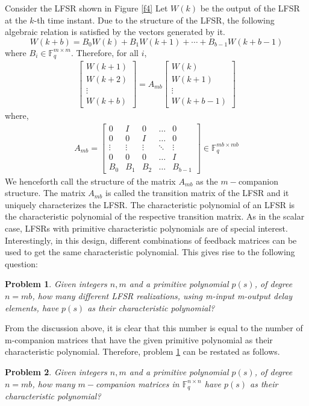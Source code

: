 \documentclass[letterpaper, 12 pt]{article}  \usepackage{amssymb}
\newtheorem{problem}{Problem}
\newcommand{\F}{\mathbb{F}}
\begin{document}
Consider the LFSR shown in Figure \ref{f4} 
Let $W(k)$ be the output
of the LFSR at the
$k$-th time instant. Due to the structure of the LFSR, the following algebraic
relation is satisfied by the vectors generated by it. 
\begin{equation}
\label{mimolrr}
 W({k+b}) = B_0W(k) + B_1W({k+1}) + \cdots + B_{b-1}W({k+b-1})
\end{equation}
where $B_i \in \F_q^{m \times m}$. Therefore, for all $i$,
\begin{eqnarray}
\label{recurrence}
\left[ \begin{matrix} W({k+1})\\W({k+2})\\ \vdots
\\W({k+b}) \end{matrix}\right] =  A_{mb}\left[ \begin{matrix} W(k)\\W({k+1})\\
\vdots \\W({k+b-1})
 \end{matrix}\right] 
\end{eqnarray}
where,
\begin{eqnarray*}
A_{mb} = \left[
\begin{matrix}
 0 & I & 0 & \ldots & 0 \\
 0 & 0 & I & \ldots & 0   \\
\vdots & \vdots & \vdots & \ddots & \vdots  \\
0 & 0 & 0 & \ldots & I  \\
B_0&B_1&B_2& \ldots & B_{b-1}
 \end{matrix}
\right] \in \F_q^{mb \times mb}
\end{eqnarray*}
We henceforth call the structure of the matrix $A_{mb}$ as the $m-$companion
structure. The matrix $A_{mb}$ is called the transition matrix of the LFSR and
it uniquely characterizes the LFSR.  The characteristic
polynomial
of an LFSR is the characteristic polynomial of the respective transition matrix.
As in the scalar case,  LFSRs with primitive characteristic polynomials are
of special interest. Interestingly, in this design, different combinations of
feedback matrices can be used to get the same characteristic polynomial. This
gives rise to the following question:
 \begin{problem}
\label{mainproblem}
 Given integers $n,m$ and a primitive polynomial $p(s)$, of degree $n = mb$, how
many different LFSR realizations, using m-input m-output delay elements, have
$p(s)$ as their characteristic polynomial?
\end{problem}
From the discussion above, it is clear that this
number is equal to the number of m-companion matrices that have the given
primitive polynomial as their characteristic polynomial. 
Therefore, problem \ref{mainproblem} can be restated as follows.
\begin{problem}
  Given integers $n,m$ and a primitive polynomial $p(s)$, of degree $n = mb$,
how many $m-$companion matrices in $\F_q^{n \times n}$ have $p(s)$ as their
characteristic polynomial?
\end{problem}
\end{document}
